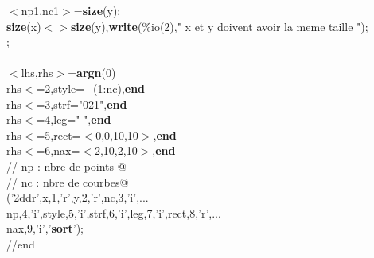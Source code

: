 {\begin{flushleft}
{\cmarg $<$np1,nc1$>$={\bf size}(y);\\ 
 {\bf size}(x)$<$$>${\bf size}(y),{\bf write}(\%io(2)," x et y doivent avoir la meme taille ");\\ 
;\\ 
\\ 
\cmarg $<$lhs,rhs$>$={\bf argn}(0)\\ 
 rhs$<$=2,style=$-$(1:nc),{\bf end}\\ 
 rhs$<$=3,strf="021",{\bf end}\\ 
 rhs$<$=4,leg=" ",{\bf end}\\ 
 rhs$<$=5,rect=$<$0,0,10,10$>$,{\bf end}\\ 
 rhs$<$=6,nax=$<$2,10,2,10$>$,{\bf end}\\ 
\cmarg \verb@// np : nbre de points @\\ 
\cmarg \verb@// nc : nbre de courbes@\\ 
('2ddr',x,1,'r',y,2,'r',nc,3,'i',...\\ 
\cmarg \hspace{0.8cm}np,4,'i',style,5,'i',strf,6,'i',leg,7,'i',rect,8,'r',...\\ 
\cmarg \hspace{0.8cm}nax,9,'i','{\bf sort}');\\ 
\cmarg //end}
\end{flushleft}}



